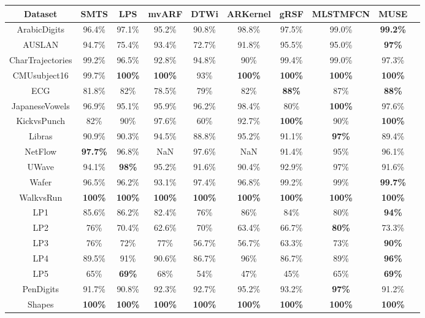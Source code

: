 \documentclass[sigconf]{acmart}
\begin{document}
\begin{table*}[t]
	\begin{centering}
		\begin{tabular*}{2\columnwidth}{@{\extracolsep{\fill}}cccccccccc}
						Dataset & SMTS & LPS & mvARF & DTWi & ARKernel & gRSF & MLSTMFCN & MUSE\tabularnewline
			\hline
			\hline 
			ArabicDigits & 96.4\% & 97.1\% & 95.2\% & 90.8\% & 98.8\% & 97.5\% & 99.0\% & \textbf{99.2\%}\tabularnewline
			\hline 
			AUSLAN & 94.7\% & 75.4\% & 93.4\% & 72.7\% & 91.8\% & 95.5\% & 95.0\% & \textbf{97\%}\tabularnewline
			\hline 
			CharTrajectories & 99.2\% & 96.5\% & 92.8\% & 94.8\% & 90\% & 99.4\% & 99.0\% & 97.3\%\tabularnewline
			\hline 
			CMUsubject16 & 99.7\% & \textbf{100\%} & \textbf{100\%} & 93\% & \textbf{100\%} & \textbf{100\%} & \textbf{100\%} & \textbf{100\%}\tabularnewline
			\hline 
			ECG & 81.8\% & 82\% & 78.5\% & 79\% & 82\% & \textbf{88\%} & 87\% & \textbf{88\%}\tabularnewline
			\hline 
			JapaneseVowels & 96.9\% & 95.1\% & 95.9\% & 96.2\% & 98.4\% & 80\% & \textbf{100\%} & 97.6\%\tabularnewline
			\hline 
			KickvsPunch & 82\% & 90\% & 97.6\% & 60\% & 92.7\% & \textbf{100\%} & 90\% & \textbf{100\%}\tabularnewline
			\hline 
			Libras & 90.9\% & 90.3\% & 94.5\% & 88.8\% & 95.2\% & 91.1\% & \textbf{97\%} & 89.4\%\tabularnewline
			\hline 
			NetFlow & \textbf{97.7\%} & 96.8\% & NaN & 97.6\% & NaN & 91.4\% & 95\% & 96.1\%\tabularnewline
			\hline 
			UWave & 94.1\% & \textbf{98\%} & 95.2\% & 91.6\% & 90.4\% & 92.9\% & 97\% & 91.6\%\tabularnewline
			\hline 
			Wafer & 96.5\% & 96.2\% & 93.1\% & 97.4\% & 96.8\% & 99.2\% & 99\% & \textbf{99.7\%}\tabularnewline
			\hline 
			WalkvsRun & \textbf{100\%} & \textbf{100\%} & \textbf{100\%} & \textbf{100\%} & \textbf{100\%} & \textbf{100\%} & \textbf{100\%} & \textbf{100\%}\tabularnewline
			\hline 
			LP1 & 85.6\% & 86.2\% & 82.4\% & 76\% & 86\% & 84\% & 80\% & \textbf{94\%}\tabularnewline
			\hline 
			LP2 & 76\% & 70.4\% & 62.6\% & 70\% & 63.4\% & 66.7\% & \textbf{80\%} & 73.3\%\tabularnewline
			\hline 
			LP3 & 76\% & 72\% & 77\% & 56.7\% & 56.7\% & 63.3\% & 73\% & \textbf{90\%}\tabularnewline
			\hline 
			LP4 & 89.5\% & 91\% & 90.6\% & 86.7\% & 96\% & 86.7\% & 89\% & \textbf{96\%}\tabularnewline
			\hline 
			LP5 & 65\% & \textbf{69\%} & 68\% & 54\% & 47\% & 45\% & 65\% & \textbf{69\%}\tabularnewline
			\hline 
			PenDigits & 91.7\% & 90.8\% & 92.3\% & 92.7\% & 95.2\% & 93.2\% & \textbf{97\%} & 91.2\%\tabularnewline
			\hline 
			Shapes & \textbf{100\%} & \textbf{100\%} & \textbf{100\%} & \textbf{100\%} & \textbf{100\%} & \textbf{100\%} & \textbf{100\%} & \textbf{100\%}\tabularnewline

\end{tabular*}
\end{centering}
\end{table*}
\end{document}
